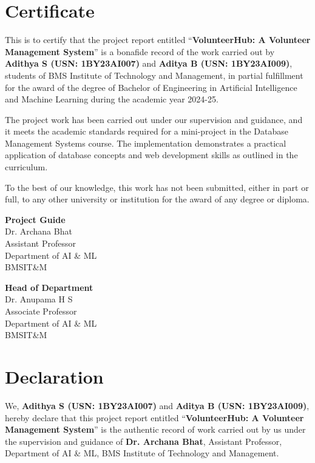 \documentclass[12pt,a4paper]{report}
\begin{document}
\chapter*{Certificate}
\thispagestyle{empty}
This is to certify that the project report entitled ``\textbf{VolunteerHub: A Volunteer Management System}'' is a bonafide record of the work carried out by \textbf{Adithya S (USN: 1BY23AI007)} and \textbf{Aditya B (USN: 1BY23AI009)}, students of BMS Institute of Technology and Management, in partial fulfillment for the award of the degree of Bachelor of Engineering in Artificial Intelligence and Machine Learning during the academic year 2024-25.

\vspace{0.7cm}

The project work has been carried out under our supervision and guidance, and it meets the academic standards required for a mini-project in the Database Management Systems course. The implementation demonstrates a practical application of database concepts and web development skills as outlined in the curriculum.

\vspace{0.7cm}

To the best of our knowledge, this work has not been submitted, either in part or full, to any other university or institution for the award of any degree or diploma.

\vfill
\noindent
\begin{minipage}[t]{0.45\textwidth}
\raggedright
\textbf{Project Guide}\\
Dr. Archana Bhat\\
Assistant Professor\\
Department of AI \& ML\\
BMSIT\&M
\end{minipage}
\hfill
\begin{minipage}[t]{0.45\textwidth}
\raggedleft
\textbf{Head of Department}\\
Dr. Anupama H S\\
Associate Professor\\
Department of AI \& ML\\
BMSIT\&M
\end{minipage}

\cleardoublepage

\chapter*{Declaration}
\thispagestyle{empty}
We, \textbf{Adithya S (USN: 1BY23AI007)} and \textbf{Aditya B (USN: 1BY23AI009)}, hereby declare that this project report entitled ``\textbf{VolunteerHub: A Volunteer Management System}'' is the authentic record of work carried out by us under the supervision and guidance of \textbf{Dr. Archana Bhat}, Assistant Professor, Department of AI \& ML, BMS Institute of Technology and Management.
\end{document}
